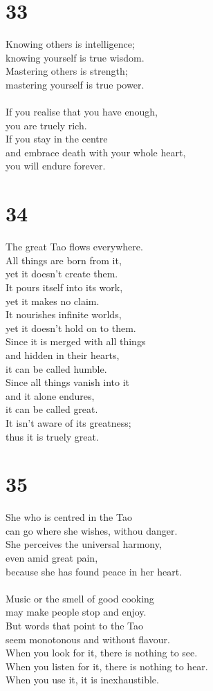 \documentclass[b5paper, 12pt, oneside]{book}
\begin{document}
\chapter*{33}
Knowing others is intelligence;\\
knowing yourself is true wisdom.\\
Mastering others is strength;\\
mastering yourself is true power.\\
\\
If you realise that you have enough,\\
you are truely rich.\\
If you stay in the centre\\
and embrace death with your whole heart,\\
you will endure forever.\\

\chapter*{34}
The great Tao flows everywhere.\\
All things are born from it,\\
yet it doesn't create them.\\
It pours itself into its work,\\
yet it makes no claim.\\
It nourishes infinite worlds,\\
yet it doesn't hold on to them.\\
Since it is merged with all things\\
and hidden in their hearts,\\
it can be called humble.\\
Since all things vanish into it\\
and it alone endures,\\
it can be called great.\\
It isn't aware of its greatness;\\
thus it is truely great.\\

\chapter*{35}
She who is centred in the Tao\\
can go where she wishes, withou danger.\\
She perceives the universal harmony,\\
even amid great pain,\\
because she has found peace in her heart.\\
\\
Music or the smell of good cooking\\
may make people stop and enjoy.\\
But words that point to the Tao\\
seem monotonous and without flavour.\\
When you look for it, there is nothing to see.\\
When you listen for it, there is nothing to hear.\\
When you use it, it is inexhaustible.\\
\end{document}
